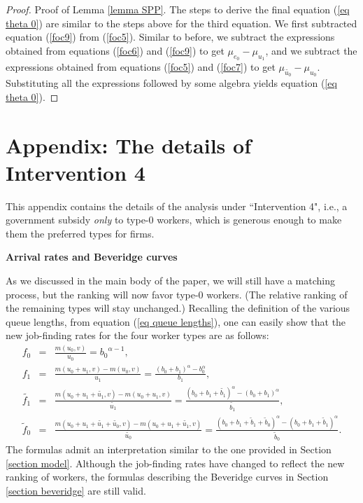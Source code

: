 \documentclass[12pt]{article} %
\theoremstyle{definition}
\begin{document}
\begin{appendix}
\begin{proof}{Proof of Lemma \ref{lemma SPP}.}
The steps to derive the final equation (\ref{eq theta 0}) are similar to the steps above for the third equation. We first subtracted equation (\ref{foc9}) from (\ref{foc5}). Similar to before, we subtract the expressions obtained from equations (\ref{foc6}) and (\ref{foc9}) to get $\mu_{e_0}-\mu_{u_1}$, and we subtract the expressions obtained from equations (\ref{foc5}) and (\ref{foc7}) to get $\mu_{\tilde{u_0}}-\mu_{u_0}$. Substituting all the expressions followed by some algebra yields equation (\ref{eq theta 0}).
\end{proof}

\fi






\section{Appendix: The details of Intervention 4 \label{section appendix intervention 4}}

This appendix contains the details of the analysis under ``Intervention 4", i.e., a government subsidy \textit{only} to type-0 workers, which is generous enough to make them the preferred types for firms. 

\medskip 

\noindent \textbf{Arrival rates and Beveridge curves}

\medskip 

\noindent As we discussed in the main body of the paper, we will still have a \cite{petrongolo2001looking} matching process, but the ranking will now favor type-0 workers. (The relative ranking of the remaining types will stay unchanged.) Recalling the definition of the various {queue lengths}, from equation (\ref{eq queue lengths}), one can easily show that the new job-finding rates for the four worker types are as follows: 
\begin{eqnarray*}
	f_0 &=& \frac{m(u_0,v)}{u_0} = {b_0}^{\alpha-1}, \\
	{f_1} &=& \frac{m(u_0+{u_1},v)-m(u_0,v)}{{u_1}} = \frac{(b_0+{b}_1)^\alpha - b_0^\alpha}{{b}_1}, \\
	\tilde{f_1} &=& \frac{m(u_0+u_1+\tilde{u_1},v)-m(u_0+{u_1},v)}{\tilde{u_1}} = \frac{(b_0+{b}_1+\tilde{b_1})^\alpha - (b_0+{b}_1)^\alpha}{\tilde{b_1}}, \\
	\tilde{f}_0 &=& \frac{m(u_0+u_1+\tilde{u_1}+\tilde{u_0},v)-m(u_0+u_1+\tilde{u_1},v)}{\tilde{u_0}} = \frac{(b_0+b_1+\tilde{b}_1+\tilde{b}_0)^\alpha - ({b_0+b_1+\tilde{b}_1})^\alpha}{\tilde{b}_0}. 
\end{eqnarray*}The formulas admit an interpretation similar to the one provided in Section \ref{section model}. Although the job-finding rates have changed to reflect the new ranking of workers, the formulas describing the Beveridge curves in Section \ref{section beveridge} are still valid.  


\end{appendix}
\end{document}
